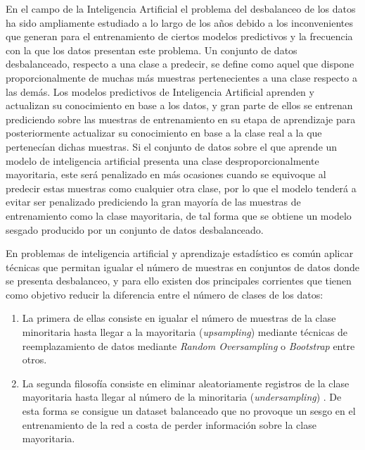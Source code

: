 
En el campo de la Inteligencia Artificial el problema del desbalanceo de los datos ha sido ampliamente estudiado a lo largo de los años debido a los inconvenientes que generan para el entrenamiento de ciertos modelos predictivos y la frecuencia con la que los datos presentan este problema. Un conjunto de datos desbalanceado, respecto a una clase a predecir, se define como aquel que dispone proporcionalmente de muchas más muestras pertenecientes a una clase respecto a las demás. Los modelos predictivos de Inteligencia Artificial aprenden y actualizan su conocimiento en base a los datos, y gran parte de ellos se entrenan prediciendo sobre las muestras de entrenamiento en su etapa de aprendizaje para posteriormente actualizar su conocimiento en base a la clase real a la que pertenecían dichas muestras. Si el conjunto de datos sobre el que aprende un modelo de inteligencia artificial presenta una clase desproporcionalmente mayoritaria, este será penalizado en más ocasiones cuando se equivoque al predecir estas muestras como cualquier otra clase, por lo que el modelo tenderá a evitar ser penalizado prediciendo la gran mayoría de las muestras de entrenamiento como la clase mayoritaria, de tal forma que se obtiene un modelo sesgado producido por un conjunto de datos desbalanceado.

En problemas de inteligencia artificial y aprendizaje estadístico es común aplicar técnicas que permitan igualar el número de muestras en conjuntos de datos donde se presenta desbalanceo, y para ello existen dos principales corrientes que tienen como objetivo reducir la diferencia entre el número de clases de los datos:

\begin{enumerate}
	\item La primera de ellas consiste en igualar el número de muestras de la clase minoritaria hasta llegar a la mayoritaria (\textit{upsampling}) mediante técnicas de reemplazamiento de datos mediante \textit{Random Oversampling} \cite{abdi2015combat} o \textit{Bootstrap} \cite{zoubir2007bootstrap} entre otros.
	\item La segunda filosofía consiste en eliminar aleatoriamente registros de la clase mayoritaria hasta llegar al número de la minoritaria (\textit{undersampling}) \cite{mohammed2020machine}. De esta forma se consigue un dataset balanceado que no provoque un sesgo en el entrenamiento de la red a costa de perder información sobre la clase mayoritaria.
\end{enumerate}

